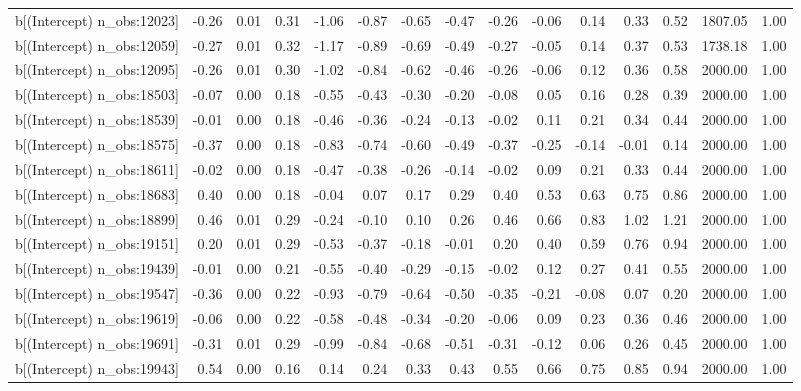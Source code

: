 \begin{table}[ht]
\begin{tabular}{rrrrrrrrrrrrrrr}
  b[(Intercept) n\_obs:12023] & -0.26 & 0.01 & 0.31 & -1.06 & -0.87 & -0.65 & -0.47 & -0.26 & -0.06 & 0.14 & 0.33 & 0.52 & 1807.05 & 1.00 \\ 
  b[(Intercept) n\_obs:12059] & -0.27 & 0.01 & 0.32 & -1.17 & -0.89 & -0.69 & -0.49 & -0.27 & -0.05 & 0.14 & 0.37 & 0.53 & 1738.18 & 1.00 \\ 
  b[(Intercept) n\_obs:12095] & -0.26 & 0.01 & 0.30 & -1.02 & -0.84 & -0.62 & -0.46 & -0.26 & -0.06 & 0.12 & 0.36 & 0.58 & 2000.00 & 1.00 \\ 
  b[(Intercept) n\_obs:18503] & -0.07 & 0.00 & 0.18 & -0.55 & -0.43 & -0.30 & -0.20 & -0.08 & 0.05 & 0.16 & 0.28 & 0.39 & 2000.00 & 1.00 \\ 
  b[(Intercept) n\_obs:18539] & -0.01 & 0.00 & 0.18 & -0.46 & -0.36 & -0.24 & -0.13 & -0.02 & 0.11 & 0.21 & 0.34 & 0.44 & 2000.00 & 1.00 \\ 
  b[(Intercept) n\_obs:18575] & -0.37 & 0.00 & 0.18 & -0.83 & -0.74 & -0.60 & -0.49 & -0.37 & -0.25 & -0.14 & -0.01 & 0.14 & 2000.00 & 1.00 \\ 
  b[(Intercept) n\_obs:18611] & -0.02 & 0.00 & 0.18 & -0.47 & -0.38 & -0.26 & -0.14 & -0.02 & 0.09 & 0.21 & 0.33 & 0.44 & 2000.00 & 1.00 \\ 
  b[(Intercept) n\_obs:18683] & 0.40 & 0.00 & 0.18 & -0.04 & 0.07 & 0.17 & 0.29 & 0.40 & 0.53 & 0.63 & 0.75 & 0.86 & 2000.00 & 1.00 \\ 
  b[(Intercept) n\_obs:18899] & 0.46 & 0.01 & 0.29 & -0.24 & -0.10 & 0.10 & 0.26 & 0.46 & 0.66 & 0.83 & 1.02 & 1.21 & 2000.00 & 1.00 \\ 
  b[(Intercept) n\_obs:19151] & 0.20 & 0.01 & 0.29 & -0.53 & -0.37 & -0.18 & -0.01 & 0.20 & 0.40 & 0.59 & 0.76 & 0.94 & 2000.00 & 1.00 \\ 
  b[(Intercept) n\_obs:19439] & -0.01 & 0.00 & 0.21 & -0.55 & -0.40 & -0.29 & -0.15 & -0.02 & 0.12 & 0.27 & 0.41 & 0.55 & 2000.00 & 1.00 \\ 
  b[(Intercept) n\_obs:19547] & -0.36 & 0.00 & 0.22 & -0.93 & -0.79 & -0.64 & -0.50 & -0.35 & -0.21 & -0.08 & 0.07 & 0.20 & 2000.00 & 1.00 \\ 
  b[(Intercept) n\_obs:19619] & -0.06 & 0.00 & 0.22 & -0.58 & -0.48 & -0.34 & -0.20 & -0.06 & 0.09 & 0.23 & 0.36 & 0.46 & 2000.00 & 1.00 \\ 
  b[(Intercept) n\_obs:19691] & -0.31 & 0.01 & 0.29 & -0.99 & -0.84 & -0.68 & -0.51 & -0.31 & -0.12 & 0.06 & 0.26 & 0.45 & 2000.00 & 1.00 \\ 
  b[(Intercept) n\_obs:19943] & 0.54 & 0.00 & 0.16 & 0.14 & 0.24 & 0.33 & 0.43 & 0.55 & 0.66 & 0.75 & 0.85 & 0.94 & 2000.00 & 1.00 \\ 

\end{tabular}
\end{table}
